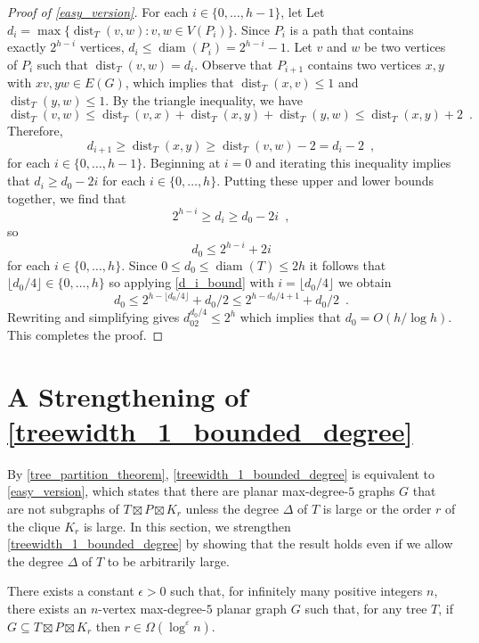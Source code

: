\documentclass{patmorin}
\DeclareMathOperator{\dist}{dist}
\DeclareMathOperator{\diam}{diam}
\begin{document}
\begin{proof}[Proof of \cref{easy_version}]
  For each $i\in\{0,\ldots,h-1\}$, let
  Let $d_i=\max\{\dist_T(v,w):v,w\in V(P_i)\}$.  Since $P_i$ is a path that contains exactly $2^{h-i}$ vertices, $d_i \le \diam(P_i) = 2^{h-i}-1$. Let $v$ and $w$ be two vertices of $P_i$ such that $\dist_T(v,w)=d_i$.  Observe that $P_{i+1}$ contains two vertices $x,y$ with $xv, yw\in E(G)$, which implies that $\dist_T(x,v)\le 1$ and $\dist_T(y,w)\le 1$.  By the triangle inequality, we have
  \[
    \dist_T(v,w) \le \dist_T(v,x)+\dist_T(x,y)+\dist_T(y,w) \le \dist_T(x,y)+2 \enspace .
  \]
  Therefore,
  \[
     d_{i+1} \ge \dist_T(x,y) \ge \dist_T(v,w)-2= d_i-2 \enspace ,
  \]
  for each $i\in\{0,\ldots,h-1\}$.  Beginning at $i=0$ and iterating this inequality implies that $d_i \ge d_0-2i$ for each $i\in\{0,\ldots,h\}$.
  Putting these upper and lower bounds together, we find that
  \[
    2^{h-i} \ge d_i \ge d_0-2i \enspace ,
  \]
  so
  \begin{equation}
    d_0 \le 2^{h-i}+2i  \label{d_i_bound}
  \end{equation}
  for each $i\in\{0,\ldots,h\}$.  Since $0\le d_0\le\diam(T)\le 2h$ it follows that $\lfloor d_0/4\rfloor\in\{0,\ldots,h\}$ so applying \cref{d_i_bound} with $i=\lfloor d_0/4\rfloor$ we obtain
  \[
    d_0 \le 2^{h-\lfloor d_0/4\rfloor} + d_0/2 \le 2^{h-d_0/4+1} + d_0/2 \enspace .
  \]
  Rewriting and simplifying gives $d_02^{d_0/4}\le 2^h$ which implies that $d_0 = O(h/\log h)$.  This completes the proof.
\end{proof}

\section{A Strengthening of \cref{treewidth_1_bounded_degree}}

By \cref{tree_partition_theorem}, \cref{treewidth_1_bounded_degree} is equivalent to \cref{easy_version}, which states that there are planar max-degree-$5$ graphs $G$ that are not subgraphs of $T\boxtimes P\boxtimes K_r$ unless the degree $\Delta$ of $T$ is large or the order $r$ of the clique $K_r$ is large.  In this section, we strengthen \cref{treewidth_1_bounded_degree} by showing that the result holds even if we allow the degree $\Delta$ of $T$ to be arbitrarily large.


\begin{lem}\label{hard_version}
  There exists a constant $\epsilon >0$ such that, for infinitely many positive integers $n$, there exists an $n$-vertex max-degree-$5$ planar graph $G$ such that, for any tree $T$, if $G\subseteq T\boxtimes P\boxtimes K_r$ then $r\in\Omega(\log^\varepsilon n)$.
\end{lem}
\end{document}
